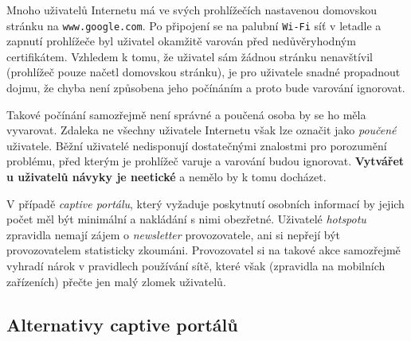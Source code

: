 \documentclass[thesis=M,czech]{FITthesis}[2012/10/20]
\begin{document}
Mnoho uživatelů Internetu má ve svých prohlížečích nastavenou domovskou stránku na \texttt{www.google.com}. Po připojení se na palubní \texttt{Wi-Fi} síť v letadle a zapnutí prohlížeče byl uživatel okamžitě varován před nedůvěryhodným certifikátem. Vzhledem k tomu, že uživatel sám žádnou stránku nenavštívil (prohlížeč pouze načetl domovskou stránku), je pro uživatele snadné propadnout dojmu, že chyba není způsobena jeho počínáním a proto bude varování ignorovat.

Takové počínání samozřejmě není správné a poučená osoba by se ho měla vyvarovat. Zdaleka ne všechny uživatele Internetu však lze označit jako \textit{poučené} uživatele. Běžní uživatelé nedisponují dostatečnými znalostmi pro porozumění problému, před kterým je prohlížeč varuje a varování budou ignorovat. \textbf{Vytvářet u uživatelů návyky  je neetické} a nemělo by k tomu docházet.

V případě \textit{captive portálu}, který vyžaduje poskytnutí osobních informací by jejich počet měl být minimální a nakládání s nimi obezřetné. Uživatelé \textit{hotspotu} zpravidla nemají zájem o \textit{newsletter} provozovatele, ani si nepřejí být provozovatelem statisticky zkoumáni. Provozovatel si na takové akce samozřejmě vyhradí nárok v pravidlech používání sítě, které však (zpravidla na mobilních zařízeních) přečte jen malý zlomek uživatelů.

%

\subsection{Alternativy captive portálů}
\end{document}

